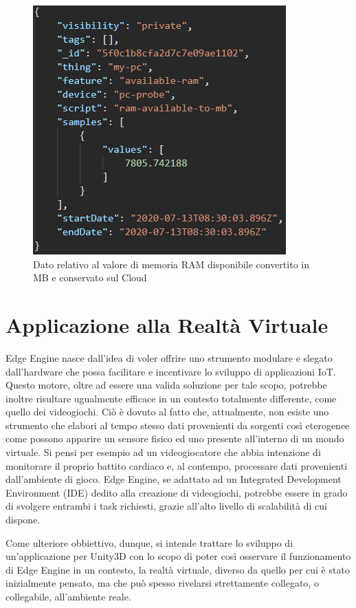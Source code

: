 \begin{figure}[H]
	\centering
	\includegraphics[scale=0.7]{pics/datowin}
	\caption{Dato relativo al valore di memoria RAM disponibile convertito in MB e conservato sul Cloud}
	\label{datowin}
\end{figure}

\section{Applicazione alla Realtà Virtuale}
Edge Engine nasce dall'idea di voler offrire uno strumento modulare e slegato dall'hardware che possa facilitare e incentivare lo sviluppo di applicazioni IoT. Questo motore, oltre ad essere una valida soluzione per tale scopo, potrebbe inoltre risultare ugualmente efficace in un contesto totalmente differente, come quello dei videogiochi. Ciò è dovuto al fatto che, attualmente, non esiste uno strumento che elabori al tempo stesso dati provenienti da sorgenti così eterogenee come possono apparire un sensore fisico ed uno presente all'interno di un mondo virtuale. Si pensi per esempio ad un videogiocatore che abbia intenzione di monitorare il proprio battito cardiaco e, al contempo, processare dati provenienti dall'ambiente di gioco. Edge Engine, se adattato ad un Integrated Development Environment (IDE) dedito alla creazione di videogiochi, potrebbe essere in grado di svolgere entrambi i task richiesti, grazie all'alto livello di scalabilità di cui dispone.

Come ulteriore obbiettivo, dunque, si intende trattare lo sviluppo di un'applicazione per Unity3D con lo scopo di poter così osservare il funzionamento di Edge Engine in un contesto, la realtà virtuale, diverso da quello per cui è stato inizialmente pensato, ma che può spesso rivelarsi strettamente collegato, o collegabile, all'ambiente reale.

